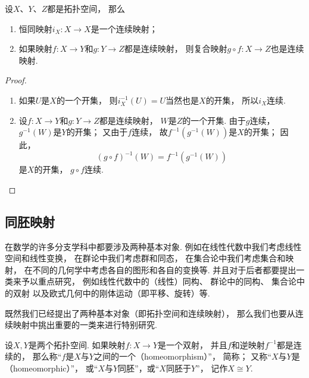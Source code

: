 \begin{theorem}\label{theorem:拓扑学.拓扑空间之间的连续映射的性质}
设\(X\)、\(Y\)、\(Z\)都是拓扑空间，
那么\begin{enumerate}
	\item 恒同映射\(i_X\colon X \to X\)是一个连续映射；
	\item 如果映射\(f\colon X \to Y\)和\(g\colon Y \to Z\)都是连续映射，
	则复合映射\(g \circ f\colon X \to Z\)也是连续映射.
\end{enumerate}
\begin{proof}
\begin{enumerate}
	\item 如果\(U\)是\(X\)的一个开集，
	则\(i_X^{-1}(U) = U\)当然也是\(X\)的开集，
	所以\(i_X\)连续.

	\item 设\(f\colon X \to Y\)和\(g\colon Y \to Z\)都是连续映射，
	\(W\)是\(Z\)的一个开集.
	由于\(g\)连续，
	\(g^{-1}(W)\)是\(Y\)的开集；
	又由于\(f\)连续，
	故\(f^{-1}(g^{-1}(W))\)是\(X\)的开集；
	因此，\[
		(g \circ f)^{-1}(W) = f^{-1}(g^{-1}(W))
	\]是\(X\)的开集，
	\(g \circ f\)连续.
	\qedhere
\end{enumerate}
\end{proof}
\end{theorem}

\subsection{同胚映射}
在数学的许多分支学科中都要涉及两种基本对象.
例如在线性代数中我们考虑线性空间和线性变换，
在群论中我们考虑群和同态，
在集合论中我们考虑集合和映射，
在不同的几何学中考虑各自的图形和各自的变换等.
并且对于后者都要提出一类来予以重点研究，
例如线性代数中的（线性）同构、
群论中的同构、
集合论中的双射
以及欧式几何中的刚体运动（即平移、旋转）等.

既然我们已经提出了两种基本对象（即拓扑空间和连续映射），
那么我们也要从连续映射中挑出重要的一类来进行特别研究.

\begin{definition}\label{definition:拓扑学.同胚映射的概念}
设\(X,Y\)是两个拓扑空间.
如果映射\(f\colon X \to Y\)是一个双射，
并且\(f\)和逆映射\(f^{-1}\)都是连续的，
那么称“\(f\)是\(X\)与\(Y\)之间的一个（homeomorphism）”，
简称；
又称“\(X\)与\(Y\)是（homeomorphic）”，
或“\(X\)与\(Y\)同胚”，或“\(X\)同胚于\(Y\)”，
记作\(X \cong Y\).
\end{definition}

